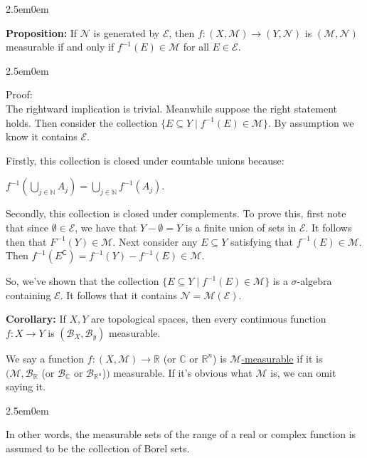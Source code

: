 \documentclass{book}
\newcommand{\hTwo}{%
\color{MidnightBlue}%
   \fontsize{13}{15}\selectfont%
}
\newcommand{\hThree}{%
   \color{PineGreen!85!Orange}
   \fontsize{12}{14}\selectfont%
}
\newenvironment{myIndent}{%
   \begin{adjustwidth}{2.5em}{0em}%
}{%
   \end{adjustwidth}%
}
\newcommand{\udefine}[1]{{%
   \setulcolor{Red}%
   \setul{0.14em}{0.07em}%
   \ul{#1}%
}}
\newcommand{\blab}[1]{\textbf{#1}}
\newcommand{\comp}{\mathsf{C}}
\newcommand{\retTwo}{\hfill\bigbreak}
\begin{document}
\begin{myIndent}\hTwo
   \blab{Proposition:} If $\mathcal{N}$ is generated by $\mathcal{E}$, then $f: (X, \mathcal{M}) \longrightarrow (Y, \mathcal{N})$ is $(\mathcal{M}, \mathcal{N})$\\ measurable if and only if $f^{-1}(E) \in \mathcal{M}$ for all $E \in \mathcal{E}$.

   \begin{myIndent}\hThree
      Proof:\\
      The rightward implication is trivial. Meanwhile suppose the right statement holds. Then consider the collection $\{E \subseteq Y \mid f^{-1}(E) \in \mathcal{M} \}$. By assumption we know it contains $\mathcal{E}$.\retTwo

      Firstly, this collection is closed under countable unions because:
      
      {\centering $f^{-1}(\bigcup\limits_{j \in \mathbb{N}}A_j) = \bigcup\limits_{j \in \mathbb{N}}f^{-1}(A_j)$.\retTwo\par}

      Secondly, this collection is closed under complements. To prove this, first note that since $\emptyset \in \mathcal{E}$, we have that $Y - \emptyset = Y$ is a finite union of sets in $\mathcal{E}$. It follows then that $F^{-1}(Y) \in \mathcal{M}$. Next consider any $E \subseteq Y$ satisfying that $f^{-1}(E) \in \mathcal{M}$. Then $f^{-1}(E^\comp) = f^{-1}(Y) - f^{-1}(E) \in \mathcal{M}$.\retTwo

      So, we've shown that the collection $\{E \subseteq Y \mid f^{-1}(E) \in \mathcal{M} \}$ is a $\sigma$-algebra\\ containing $\mathcal{E}$. It follows that it contains $\mathcal{N} = \mathcal{M}(\mathcal{E})$.\newpage
   \end{myIndent}

   \blab{Corollary:} If $X, Y$ are topological spaces, then every continuous function\\ $f: X \longrightarrow Y$ is $(\mathcal{B}_X, \mathcal{B}_y)$ measurable.\retTwo
\end{myIndent}

We say a function $f: (X, \mathcal{M}) \longrightarrow \mathbb{R}$ (or $\mathbb{C}$ or $\mathbb{R}^n$) is \udefine{$\mathcal{M}$-measurable} if it is\\ $(\mathcal{M}, \mathcal{B}_{\mathbb{R}}$ (or $\mathcal{B}_{\mathbb{C}}$ or $\mathcal{B}_{\mathbb{R}^n}$)$)$ measurable. If it's obvious what $\mathcal{M}$ is, we can omit\\ saying it.
\begin{myIndent}
   In other words, the measurable sets of the range of a real or complex function is assumed to be the collection of Borel sets.\retTwo
\end{myIndent}
\end{document}
